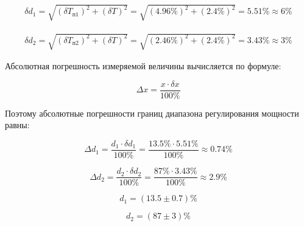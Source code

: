 \begin{displaymath}
\begin{aligned}
	\delta d_1 = \sqrt{(\delta T_{\text{п1}})^2 + (\delta T)^2} = \sqrt{(4.96\%)^2 + (2.4\%)^2} = 5.51\% \approx 6\%
\end{aligned}
\end{displaymath}

\begin{displaymath}
\begin{aligned}
	\delta d_2 = \sqrt{(\delta T_{\text{п2}})^2 + (\delta T)^2} = \sqrt{(2.46\%)^2 + (2.4\%)^2} = 3.43 \% \approx 3\%
\end{aligned}
\end{displaymath}

Абсолютная погрешность измеряемой величины вычисляется по формуле:

\begin{equation}
	\Delta x = \frac{x \cdot \delta x}{100 \%}
\end{equation}

Поэтому абсолютные погрешности границ диапазона регулирования мощности равны:

\begin{displaymath}
	\Delta d_1 = \frac{d_1 \cdot \delta d_1}{100 \%} = \frac{13.5 \% \cdot 5.51 \%}{100 \%} \approx 0.74 \%
\end{displaymath}

\begin{displaymath}
	\Delta d_2 = \frac{d_2 \cdot \delta d_2}{100 \%} = \frac{87 \% \cdot 3.43 \%}{100 \%} \approx 2.9 \%
\end{displaymath}

\begin{displaymath}
	d_1 = (13.5 \pm 0.7)\%
\end{displaymath}

\begin{displaymath}
	d_2 = (87 \pm 3)\%
\end{displaymath}


